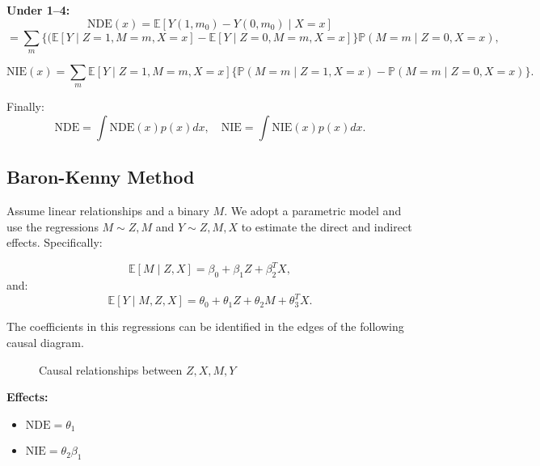 \textbf{Under 1--4:}
\[
\text{NDE}(x) = \mathbb{E}[Y(1, m_0) - Y(0, m_0) \mid X = x]
\]
\[
= \sum_m \Big\{(\mathbb{E}[Y \mid Z = 1, M = m, X = x] 
- \mathbb{E}[Y \mid Z = 0, M = m, X = x] 
\Big\} \mathbb{P}(M = m \mid Z = 0, X = x),
\]

\[
\text{NIE}(x) = \sum_m \mathbb{E}[Y \mid Z = 1, M = m, X = x] 
 \Big\{\mathbb{P}(M = m \mid Z = 1, X = x) - \mathbb{P}(M = m \mid Z = 0, X = x)\Big\}.
\]

Finally:
\[
\text{NDE} = \int \text{NDE}(x) p(x) dx, \quad \text{NIE} = \int \text{NIE}(x) p(x) dx.
\]

\subsection*{Baron-Kenny Method}

Assume linear relationships and a binary $M$. We adopt a parametric model and use the regressions $M\sim Z,M$ and $Y\sim Z,M,X$ to estimate the direct and indirect effects. Specifically:

\begin{equation}
\mathbb{E}[M \mid Z, X] = \beta_0 + \beta_1 Z + \beta_2^T X,    
\end{equation}
and:
\begin{equation}
\mathbb{E}[Y \mid M, Z, X] = \theta_0 + \theta_1 Z + \theta_2 M + \theta_3^T X.    
\end{equation}

The coefficients in this regressions can be identified in the edges of the following causal diagram.

\begin{figure}[h]
    \centering
    \caption{Causal relationships between $Z,X,M,Y$}
    \label{fig:enter-label}
\end{figure}






\textbf{Effects:}
\begin{itemize}
    \item $\text{NDE} = \theta_1$
    \item $\text{NIE} = \theta_2 \beta_1$
\end{itemize}

